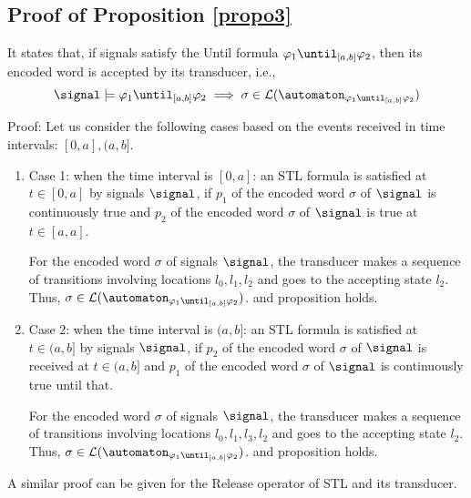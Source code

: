 \subsection{Proof of Proposition \ref{propo3}}
It states that, if signals  satisfy the Until formula $ \varphi_1\until_{[a,b]}\varphi_2$, then its encoded word is accepted by its transducer, i.e., 
    \begin{align*}
        \signal \models \varphi_1\until_{[a,b]}\varphi_2 \implies \sigma \in 
        \mathcal{L}(\automaton_{\varphi_1\until_{[a,b]}\varphi_2}) 
    \end{align*}

    Proof: Let us consider the following cases based on the events received in time intervals: $[0, a], (a,b]$.
    \begin{enumerate}
        \item Case 1: when the time interval is $[0,a]$: an STL formula is satisfied at $t\in [0, a]$ by signals $\signal$, if $p_1$ of the encoded word $\sigma$ of $\signal$ is continuously true and $p_2$ of the encoded word $\sigma$ of $\signal$ is true at $t\in[a, a]$.

        For the encoded word $\sigma$ of signals $\signal$, the transducer makes a sequence of transitions involving locations $l_0, l_1, l_2$ and goes to the accepting state $l_2$. Thus,  $\sigma \in 
        \mathcal{L}(\automaton_{\varphi_1\until_{[a,b]}\varphi_2})$. and proposition holds.

        \item  Case 2: when the time interval is $(a,b]$: an STL formula is satisfied at $t\in (a,b]$ by signals $\signal$, if $p_2$ of the encoded word $\sigma$ of $\signal$ is received at $t\in (a,b]$ and  $p_1$ of the encoded word  $\sigma$ of $\signal$  is continuously true until that.

        For the encoded word $\sigma$ of signals $\signal$, the transducer makes a sequence of transitions involving locations $l_0, l_1, l_3, l_2$ and goes to the accepting state $l_2$. Thus,  $\sigma \in 
        \mathcal{L}(\automaton_{\varphi_1\until_{[a,b]}\varphi_2})$. and proposition holds.
    \end{enumerate}

A similar proof can be given for the Release operator of STL and its transducer.








